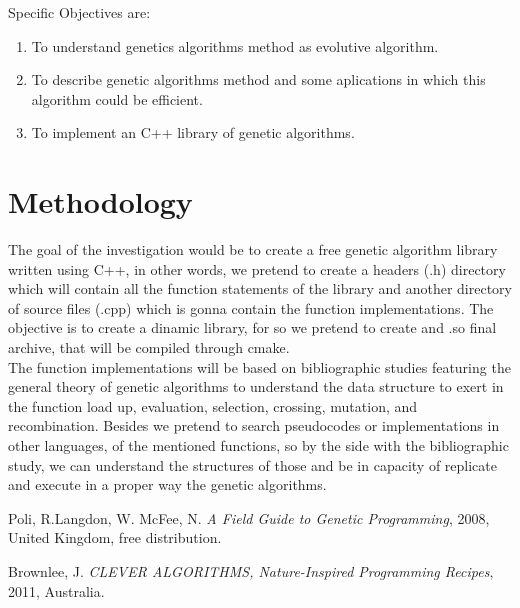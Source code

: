 \documentclass[letterpaper]{article}
\begin{document}
Specific Objectives are:\\

\begin{enumerate}
\item To understand genetics algorithms method as evolutive algorithm.
\item To describe genetic algorithms method and some aplications in which this algorithm could be efficient.
\item To implement an C++ library of genetic algorithms.
\end{enumerate}

\section{Methodology}


The goal of the investigation would be to create a free genetic algorithm library written using C++, in other words, we pretend to create a headers (.h) directory which will contain all the function statements of the library and another directory of source files (.cpp) which is gonna contain the function implementations. The objective is to create a dinamic library, for so we pretend to create and .so final archive, that will be compiled through cmake.
\\
The function implementations will be based on bibliographic studies featuring the general theory of genetic algorithms to understand the data structure to exert in the function load up, evaluation, selection, crossing, mutation, and recombination. Besides we pretend to search pseudocodes or implementations in other languages, of the mentioned functions, so by the side with the bibliographic study, we can understand the structures of those and be in capacity of replicate and execute in a proper way the genetic algorithms.
\\



\begin{thebibliography}{99}
Poli, R.Langdon, W. McFee, N. \textit{A Field Guide to Genetic Programming}, 2008, United Kingdom, free distribution.

Brownlee, J. \textit{CLEVER ALGORITHMS, Nature-Inspired Programming Recipes}, 2011, Australia.

\end{thebibliography}
\end{document}
